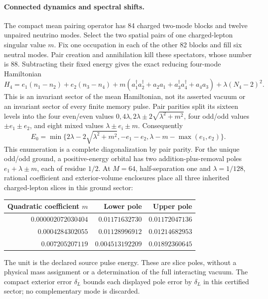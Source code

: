 \paragraph{Connected dynamics and spectral shifts.}
The compact mean pairing operator has 84 charged two-mode blocks and
twelve unpaired neutrino modes. Select the two spatial pairs of one
charged-lepton singular value $m$. Fix one occupation in each of the other
82 blocks and fill six neutral modes. Pair creation and annihilation kill
these spectators, whose number is 88. Subtracting their fixed energy gives
the exact reducing four-mode Hamiltonian
\[
 H_4=e_1(n_1-n_2)+e_2(n_3-n_4)
       +m(a_1^\dagger a_2^\dagger+a_2a_1+
       a_3^\dagger a_4^\dagger+a_4a_3)+\lambda(N_4-2)^2.
\]
This is an invariant sector of the mean Hamiltonian, not its asserted
vacuum or an invariant sector of every finite memory pulse.
Pair parities split its sixteen levels into the four even/even values
$0,4\lambda,2\lambda\pm2\sqrt{\lambda^2+m^2}$, four odd/odd values
$\pm e_1\pm e_2$, and eight mixed values $\lambda\pm e_i\pm m$.
Consequently
\[
 E_0=\min\{2\lambda-2\sqrt{\lambda^2+m^2},
            -e_1-e_2,\lambda-m-\max(e_1,e_2)\}.
\]
This enumeration is a complete diagonalization by pair parity. For the
unique odd/odd ground, a positive-energy orbital has two addition-plus-removal
poles $e_1+\lambda\pm m$, each of residue $1/2$. At $M=64$, half-separation
one and $\lambda=1/128$, rational coefficient and exterior-volume enclosures
place all three inherited charged-lepton slices in this ground sector:
\begin{center}\small
\begin{tabular}{@{}rrr@{}}
\toprule
Quadratic coefficient $m$ & Lower pole & Upper pole\\
\midrule
$0.000002072030404$ & $0.01171632730$ & $0.01172047136$\\
$0.0004284302055$ & $0.01128996912$ & $0.01214682953$\\
$0.007205207119$ & $0.004513192209$ & $0.01892360645$\\
\bottomrule
\end{tabular}
\end{center}
The unit is the declared source pulse energy. These are slice poles, without
a physical mass assignment or a determination of the full interacting vacuum.
The compact exterior error $\delta_L$ bounds each displayed pole error by
$\delta_L$ in this certified sector; no complementary mode is discarded.

